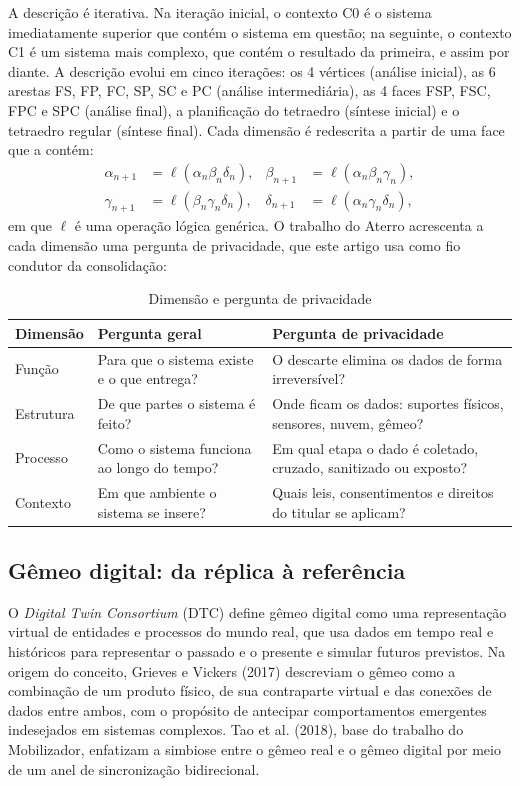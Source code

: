 \documentclass[12pt,a4paper,article,oneside,english,brazil]{abntex2}
\newcommand{\fontetab}[1]{\par\vspace{3pt}{\small\noindent Fonte: #1\par}}
\begin{document}
A descrição é iterativa. Na iteração inicial, o contexto C0 é o sistema imediatamente superior que contém o sistema em questão; na seguinte, o contexto C1 é um sistema mais complexo, que contém o resultado da primeira, e assim por diante. A descrição evolui em cinco iterações: os 4 vértices (análise inicial), as 6 arestas FS, FP, FC, SP, SC e PC (análise intermediária), as 4 faces FSP, FSC, FPC e SPC (análise final), a planificação do tetraedro (síntese inicial) e o tetraedro regular (síntese final). Cada dimensão é redescrita a partir de uma face que a contém:
\begin{align*}
\alpha_{n+1} &= \ell(\alpha_n \beta_n \delta_n), & \beta_{n+1} &= \ell(\alpha_n \beta_n \gamma_n),\\
\gamma_{n+1} &= \ell(\beta_n \gamma_n \delta_n), & \delta_{n+1} &= \ell(\alpha_n \gamma_n \delta_n),
\end{align*}
em que $\ell$ é uma operação lógica genérica. O trabalho do Aterro acrescenta a cada dimensão uma pergunta de privacidade, que este artigo usa como fio condutor da consolidação:

\begin{table}[!htbp]
\centering
\caption{Dimensão e pergunta de privacidade}
\label{tab:dimensao-pergunta}
\small
\begin{tabularx}{\linewidth}{l Y Y}
\hline
\textbf{Dimensão} & \textbf{Pergunta geral} & \textbf{Pergunta de privacidade}\\
\hline
Função & Para que o sistema existe e o que entrega? & O descarte elimina os dados de forma irreversível?\\
Estrutura & De que partes o sistema é feito? & Onde ficam os dados: suportes físicos, sensores, nuvem, gêmeo?\\
Processo & Como o sistema funciona ao longo do tempo? & Em qual etapa o dado é coletado, cruzado, sanitizado ou exposto?\\
Contexto & Em que ambiente o sistema se insere? & Quais leis, consentimentos e direitos do titular se aplicam?\\
\hline
\end{tabularx}
\fontetab{Elaborado pelos autores (2026).}
\end{table}

\subsection{Gêmeo digital: da réplica à referência}

O \textit{Digital Twin Consortium} (DTC) define gêmeo digital como uma representação virtual de entidades e processos do mundo real, que usa dados em tempo real e históricos para representar o passado e o presente e simular futuros previstos. Na origem do conceito, Grieves e Vickers (2017) descreviam o gêmeo como a combinação de um produto físico, de sua contraparte virtual e das conexões de dados entre ambos, com o propósito de antecipar comportamentos emergentes indesejados em sistemas complexos. Tao et al. (2018), base do trabalho do Mobilizador, enfatizam a simbiose entre o gêmeo real e o gêmeo digital por meio de um anel de sincronização bidirecional.
\end{document}
